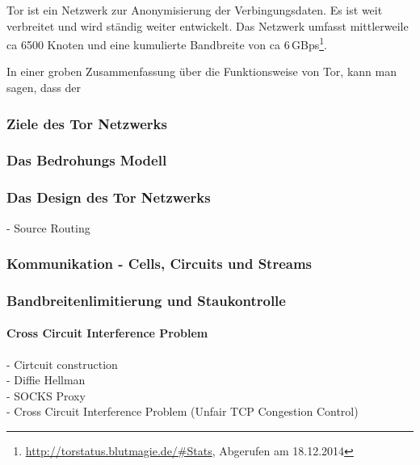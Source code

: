 \documentclass[fleqn,envcountsame,runningheads,10pt,a4paper]{llncs}
\begin{document}
Tor ist ein Netzwerk zur Anonymisierung der Verbingungsdaten. Es ist weit verbreitet und wird ständig weiter entwickelt. Das Netzwerk umfasst mittlerweile ca 6500 Knoten und eine kumulierte Bandbreite von ca 6\,GBps\footnote{\url{http://torstatus.blutmagie.de/\#Stats}, Abgerufen am 18.12.2014}.

In einer groben Zusammenfassung über die Funktionsweise von Tor, kann man sagen, dass der 

\subsubsection{Ziele des Tor Netzwerks}
\label{sec:goals}

\subsubsection{Das Bedrohungs Modell}
\label{sec:threatmodel}

\subsubsection{Das Design des Tor Netzwerks}
\label{sec:tordesign}


- Source Routing\\

\subsubsection{Kommunikation - Cells, Circuits und Streams}
\label{sec:communication}

\subsubsection{Bandbreitenlimitierung und Staukontrolle}
\label{sec:communication}

\paragraph{Cross Circuit Interference Problem}
\label{sec:crosscircuitinterference}



- Cirtcuit construction\\
- Diffie Hellman\\
- SOCKS Proxy\\
- Cross Circuit Interference Problem (Unfair TCP Congestion Control)\\

\end{document}
